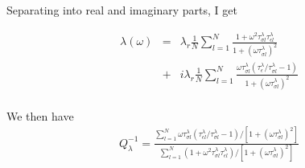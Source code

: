\documentclass[11pt]{article}
\begin{document}
Separating into real and imaginary parts, I get

\begin{eqnarray}
\lambda(\omega) & = & \lambda_r 
\frac{1}{N}\sum_{l=1}^N
\frac{1+\omega^2\tau^{\lambda}_{\sigma l}\tau^{\lambda}_{\epsilon l}}
     {1+(\omega\tau^{\lambda}_{\sigma l})^2}  \\\nonumber
                & + & i\lambda_r \frac{1}{N}\sum_{l=1}^N\frac{\omega\tau^{\lambda}_{\sigma l}(\tau^{\lambda}_{\epsilon}/\tau^{\lambda}_{\sigma l}-1)}
                                                              {1+(\omega\tau^{\lambda}_{\sigma l})^2}  \nonumber\\
\end{eqnarray}

We then have
\begin{eqnarray}
Q^{-1}_{\lambda} = \frac{\sum_{l=1}^N {\omega\tau^{\lambda}_{\sigma l}\left(\tau^{\lambda}_{\epsilon l}/\tau^{\lambda}_{\sigma l} -1\right)}
                                           /\left[1 + (\omega\tau^{\lambda}_{\sigma l})^2\right] 
                        }
                        {\sum_{l=1}^N (1 + \omega^2\tau^{\lambda}_{\sigma l}\tau^{\lambda}_{\epsilon l})
                                           /\left[1 + (\omega\tau^{\lambda}_{\sigma l})^2\right]       
                        }
\end{eqnarray}
\end{document}
